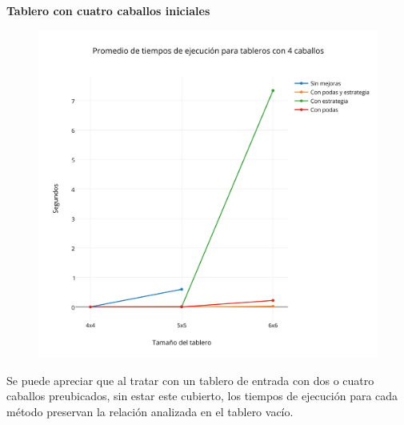  \newpage
 
\textbf{{\Large Tablero con cuatro caballos iniciales}}

 \begin{figure}[h!]
   \begin{center}
   \includegraphics[scale=0.3]{../src/ej3/Mediciones/4caballos/promedios1.png} 
   \end{center}
 \end{figure}
 
Se puede apreciar que al tratar con un tablero de entrada con dos o cuatro caballos preubicados, sin estar este cubierto, los tiempos de ejecución para cada método preservan la relación analizada en el tablero vacío.\\




 

